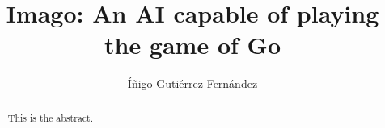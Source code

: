 \documentclass{article}
\newcommand{\program}{Imago}
\newcommand{\inputtex}[1]{}
\begin{document}
\frenchspacing

\title{\program: An AI capable of playing the game of Go}

\author{Íñigo Gutiérrez Fernández}

\date{}

\maketitle

\begin{abstract}
	This is the abstract.
\end{abstract}

\tableofcontents

\inputtex{introduction.tex}

\inputtex{previousWorks.tex}

\inputtex{interface.tex}

\inputtex{implementation.tex}

\printbibliography{}
\end{document}
